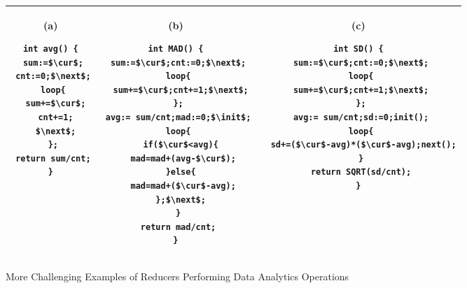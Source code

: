 \begin{figure}
	\centering
	\lstset{language=C,
		basicstyle=\ttfamily\scriptsize}
	\begin{tabular}{|c|c|c|}
		\hline
		\begin{minipage}[t]{0.25\textwidth}
			(a)
			\begin{lstlisting}[mathescape=true]
int avg() {
 sum:=$\cur$;
 cnt:=0;$\next$;
 loop{
  sum+=$\cur$;
  cnt+=1;
  $\next$;
 };
 return sum/cnt;
}
			\end{lstlisting}
		\end{minipage}&
		\begin{minipage}[t]{0.35\textwidth}
			(b)
\begin{lstlisting}[mathescape=true]
int MAD() {
 sum:=$\cur$;cnt:=0;$\next$;
 loop{
  sum+=$\cur$;cnt+=1;$\next$;
 };
 avg:= sum/cnt;mad:=0;$\init$;
 loop{
  if($\cur$<avg){
   mad=mad+(avg-$\cur$);
  }else{
   mad=mad+($\cur$-avg);
  };$\next$;
 }
 return mad/cnt;
}
\end{lstlisting}
		\end{minipage}&
		\begin{minipage}[t]{0.4\textwidth}
			(c)
			\begin{lstlisting}[mathescape=true]
int SD() {
 sum:=$\cur$;cnt:=0;$\next$;
 loop{
 sum+=$\cur$;cnt+=1;$\next$;
 };
 avg:= sum/cnt;sd:=0;init();
 loop{
  sd+=($\cur$-avg)*($\cur$-avg);next();
 }
 return SQRT(sd/cnt);
}
			\end{lstlisting}
		\end{minipage}\\
		\hline		
	\end{tabular}
	\caption{More Challenging Examples of Reducers Performing Data Analytics Operations}
	\label{fig:examples2}
\end{figure}